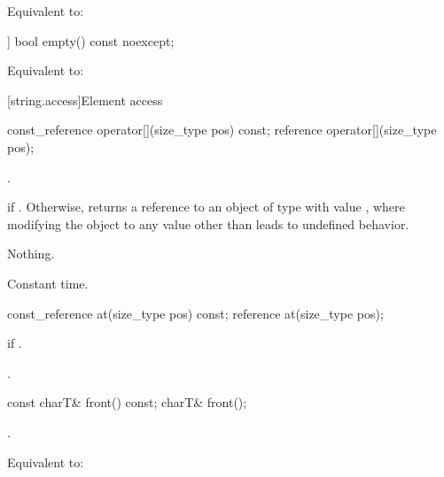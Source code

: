\begin{itemdescr}
\pnum
\effects
Equivalent to: 
\end{itemdescr}

%
\begin{itemdecl}
[[nodiscard]] bool empty() const noexcept;
\end{itemdecl}

\begin{itemdescr}
\pnum
\effects Equivalent to:
\end{itemdescr}

[string.access]{Element access}

%
\begin{itemdecl}
const_reference operator[](size_type pos) const;
reference       operator[](size_type pos);
\end{itemdecl}

\begin{itemdescr}
\pnum
\expects {}.

\pnum
\returns {} if . Otherwise,
returns a reference to an object of type  with value
, where modifying the object to any value other than
 leads to undefined behavior.

\pnum
\throws Nothing.

\pnum
\complexity Constant time.
\end{itemdescr}

%
\begin{itemdecl}
const_reference at(size_type pos) const;
reference       at(size_type pos);
\end{itemdecl}

\begin{itemdescr}
\pnum
\throws
{}
if
.

\pnum
\returns
{}.
\end{itemdescr}

%
\begin{itemdecl}
const charT& front() const;
charT& front();
\end{itemdecl}

\begin{itemdescr}
\pnum
\expects
{}.

\pnum
\effects
Equivalent to: 
\end{itemdescr}

